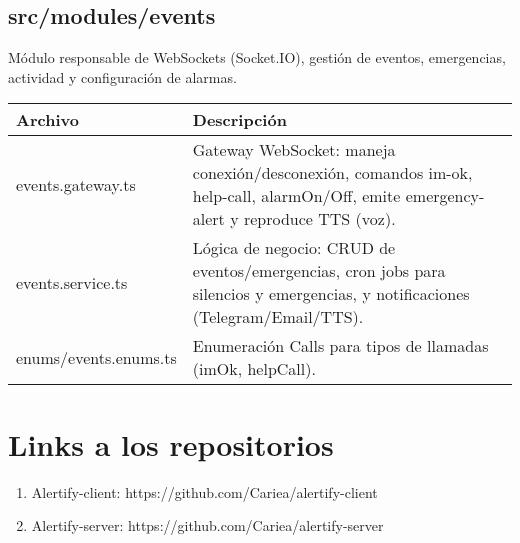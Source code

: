 \subsection*{src/modules/events}

Módulo responsable de WebSockets (Socket.IO), gestión de eventos, emergencias, actividad y configuración de alarmas.

\begin{table}[H]
  \doublespacing
  \begin{tabularx}{\textwidth}{l X}
    \hline
    \textbf{Archivo}        & \textbf{Descripción}                                                                                                                                                       \\
    \hline
    events.gateway.ts       & Gateway WebSocket: maneja conexión/desconexión, comandos im-ok, help-call, alarmOn/Off, emite emergency-alert y reproduce TTS (voz).                                       \\
    events.service.ts       & Lógica de negocio: CRUD de eventos/emergencias, cron jobs para silencios y emergencias, y notificaciones (Telegram/Email/TTS). \\
    enums/events.enums.ts   & Enumeración Calls para tipos de llamadas (imOk, helpCall).                                                                                                                 \\
    \hline
  \end{tabularx}
\end{table}

\section*{Links a los repositorios}

\begin{enumerate}
  \item Alertify-client: https://github.com/Cariea/alertify-client
  \item Alertify-server: https://github.com/Cariea/alertify-server
\end{enumerate}
